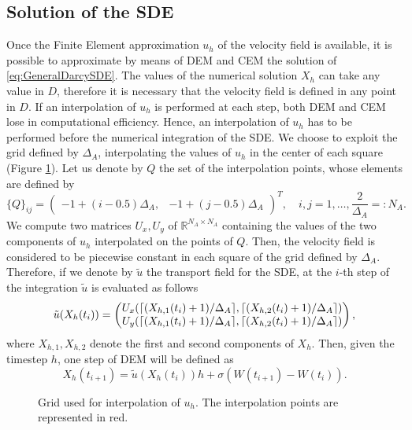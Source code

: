 \subsection{Solution of the SDE}

Once the Finite Element approximation $u_h$ of the velocity field is available, it is possible to approximate by means of DEM and CEM the solution of \eqref{eq:GeneralDarcySDE}. The values of the numerical solution $X_h$ can take any value in $D$, therefore it is necessary that the velocity field is defined in any point in $D$. If an interpolation of $u_h$ is performed at each step, both DEM and CEM lose in computational efficiency. Hence, an interpolation of $u_h$ has to be performed before the numerical integration of the SDE. We choose to exploit the grid defined by $\Delta_A$, interpolating the values of $u_h$ in the center of each square (Figure \ref{fig:GridVelocity}). Let us denote by $Q$ the set of the interpolation points, whose elements are defined by
\begin{equation}\label{eq:InterpMatrix}
	\{Q\}_{ij} = \begin{pmatrix} -1 + (i-0.5)\Delta_A, & -1 + (j-0.5)\Delta_A \end{pmatrix}^T, \quad i,j = 1, \dots, \frac{2}{\Delta_A} =: N_A.
\end{equation}
We compute two matrices $U_x, U_y$ of $\mathbb{R}^{N_A \times N_A}$ containing the values of the two components of $u_h$ interpolated on the points of $Q$. Then, the velocity field is considered to be piecewise constant in each square of the grid defined by $\Delta_A$. Therefore, if we denote by $\tilde{u}$ the transport field for the SDE, at the $i$-th step of the integration $\tilde{u}$ is evaluated as follows
\begin{equation}\label{eq:VelEval}
	\tilde{u}(X_h(t_i)) = \begin{pmatrix}	U_x(\lceil(X_{h,1}(t_i)+1)/\Delta_A\rceil,\lceil(X_{h,2}(t_i)+1)/\Delta_A\rceil) \\
					U_y(\lceil(X_{h,1}(t_i)+1)/\Delta_A\rceil,\lceil(X_{h,2}(t_i)+1)/\Delta_A\rceil) \end{pmatrix},
\end{equation}
where $X_{h,1}, X_{h,2}$ denote the first and second components of $X_h$. Then, given the timestep $h$, one step of DEM will be defined as
\begin{equation}
	X_h(t_{i+1}) = \tilde{u}(X_h(t_i)) h + \sigma (W(t_{i+1}) - W(t_i)).
\end{equation}

\begin{figure}[t]
    \centering
    \resizebox{0.8\linewidth}{!}{ }  
    \caption{Grid used for interpolation of $u_h$. The interpolation points are represented in red.}
    \label{fig:GridVelocity}
\end{figure}


